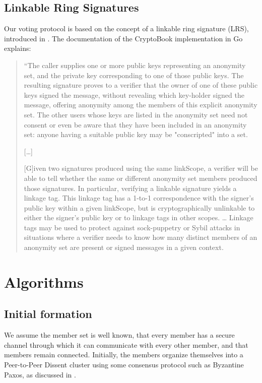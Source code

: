 \subsection{Linkable Ring Signatures}
Our voting protocol is based on the concept of a linkable ring signature (LRS),
introduced in \cite{lrs}. The documentation of the CryptoBook implementation in
Go explains:
\begin{quote}
 ``The caller supplies one or more public keys representing an anonymity set,
 and the private key corresponding to one of those public keys. The resulting
 signature proves to a verifier that the owner of one of these public keys
 signed the message, without revealing which key-holder signed the message,
 offering anonymity among the members of this explicit anonymity set. The other
 users whose keys are listed in the anonymity set need not consent or even be
 aware that they have been included in an anonymity set: anyone having a
 suitable public key may be "conscripted" into a set.

 [\ldots]

  [G]iven two signatures produced using the same linkScope, a verifier will be
  able to tell whether the same or different anonymity set members produced
  those signatures. In particular, verifying a linkable signature yields a
  linkage tag.  This linkage tag has a 1-to-1 correspondence with the signer's
  public key within a given linkScope, but is cryptographically unlinkable to
  either the signer's public key or to linkage tags in other scopes. \ldots
  Linkage tags may be used to protect against sock-puppetry or Sybil attacks in
  situations where a verifier needs to know how many distinct members of an
  anonymity set are present or signed messages in a given context.
\end{quote}
\cite{golrs}
\section{Algorithms}
\subsection{Initial formation}
We assume the member set is well known, that every member has a secure channel
through which it can communicate with every other member, and that members
remain connected. Initially, the members organize themselves into a Peer-to-Peer
Dissent cluster \cite{p2pd} using some consensus protocol such as Byzantine
Paxos, as discussed in \cite{sec}.

